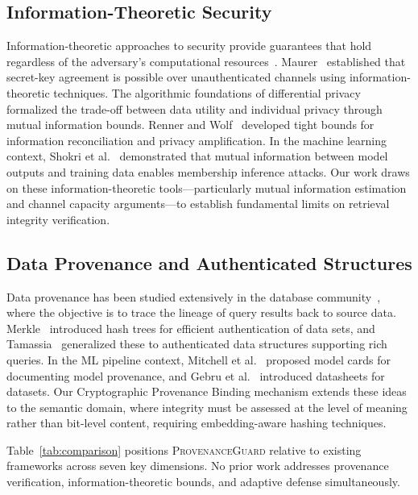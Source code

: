 \documentclass[journal,10pt]{IEEEtran}
\begin{document}
\subsection{Information-Theoretic Security}
Information-theoretic approaches to security provide guarantees that hold regardless of the adversary's computational resources~\cite{shannon1949secrecy}. Maurer~\cite{maurer1999information} established that secret-key agreement is possible over unauthenticated channels using information-theoretic techniques. The algorithmic foundations of differential privacy~\cite{dwork2014algorithmic} formalized the trade-off between data utility and individual privacy through mutual information bounds. Renner and Wolf~\cite{renner2008security} developed tight bounds for information reconciliation and privacy amplification. In the machine learning context, Shokri et al.~\cite{shokri2017membership} demonstrated that mutual information between model outputs and training data enables membership inference attacks. Our work draws on these information-theoretic tools---particularly mutual information estimation and channel capacity arguments---to establish fundamental limits on retrieval integrity verification.

\subsection{Data Provenance and Authenticated Structures}
Data provenance has been studied extensively in the database community~\cite{buneman2001provenance, cheney2009provenance}, where the objective is to trace the lineage of query results back to source data. Merkle~\cite{merkle1980protocols} introduced hash trees for efficient authentication of data sets, and Tamassia~\cite{tamassia2003authenticated} generalized these to authenticated data structures supporting rich queries. In the ML pipeline context, Mitchell et al.~\cite{mitchell2019model} proposed model cards for documenting model provenance, and Gebru et al.~\cite{gebru2021datasheets} introduced datasheets for datasets. Our Cryptographic Provenance Binding mechanism extends these ideas to the semantic domain, where integrity must be assessed at the level of meaning rather than bit-level content, requiring embedding-aware hashing techniques.

Table~\ref{tab:comparison} positions \textsc{ProvenanceGuard} relative to existing frameworks across seven key dimensions. No prior work addresses provenance verification, information-theoretic bounds, and adaptive defense simultaneously.
\end{document}
